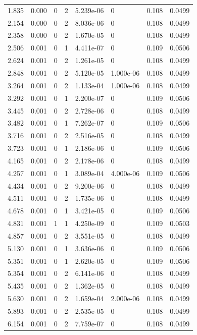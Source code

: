 \documentclass[preview]{standalone}
\begin{document}
{{\begin{tabular}{L{1.2cm}C{1.2cm} C{0.3cm}C{0.5cm} C{1.4cm}C{1.4cm} C{1.4cm}C{1.4cm}}
  1.835  &  0.000  & 0     &  2 &  5.239e-06  & 0  & 0.108 &  0.0499   \\ 
  2.154  &  0.000  & 0     &  2 &  8.036e-06  & 0  & 0.108 &  0.0499   \\ 
  2.358  &  0.000  & 0     &  2 &  1.670e-05  & 0  & 0.108 &  0.0499   \\ 
  2.506  &  0.001  & 0     &  1 &  4.411e-07  & 0  & 0.109 &  0.0506   \\ 
  2.624  &  0.001  & 0     &  2 &  1.261e-05  & 0  & 0.108 &  0.0499   \\ 
  2.848  &  0.001  & 0     &  2 &  5.120e-05  & 1.000e-06  & 0.108 &  0.0499   \\ 
  3.264  &  0.001  & 0     &  2 &  1.133e-04  & 1.000e-06  & 0.108 &  0.0499   \\ 
  3.292  &  0.001  & 0     &  1 &  2.200e-07  & 0  & 0.109 &  0.0506   \\ 
  3.445  &  0.001  & 0     &  2 &  2.728e-06  & 0  & 0.108 &  0.0499   \\ 
  3.482  &  0.001  & 0     &  1 &  7.262e-07  & 0  & 0.109 &  0.0506   \\ 
  3.716  &  0.001  & 0     &  2 &  2.516e-05  & 0  & 0.108 &  0.0499   \\ 
  3.723  &  0.001  & 0     &  1 &  2.186e-06  & 0  & 0.109 &  0.0506   \\ 
  4.165  &  0.001  & 0     &  2 &  2.178e-06  & 0  & 0.108 &  0.0499   \\ 
  4.257  &  0.001  & 0     &  1 &  3.089e-04  & 4.000e-06  & 0.109 &  0.0506   \\ 
  4.434  &  0.001  & 0     &  2 &  9.200e-06  & 0  & 0.108 &  0.0499   \\ 
  4.511  &  0.001  & 0     &  2 &  1.735e-06  & 0  & 0.108 &  0.0499   \\ 
  4.678  &  0.001  & 0     &  1 &  3.421e-05  & 0  & 0.109 &  0.0506   \\ 
  4.831  &  0.001  & 1     &  1 &  4.250e-09  & 0  & 0.109 &  0.0503   \\ 
  4.857  &  0.001  & 0     &  2 &  3.551e-05  & 0  & 0.108 &  0.0499   \\ 
  5.130  &  0.001  & 0     &  1 &  3.636e-06  & 0  & 0.109 &  0.0506   \\ 
  5.351  &  0.001  & 0     &  1 &  2.620e-05  & 0  & 0.109 &  0.0506   \\ 
  5.354  &  0.001  & 0     &  2 &  6.141e-06  & 0  & 0.108 &  0.0499   \\ 
  5.435  &  0.001  & 0     &  2 &  1.362e-05  & 0  & 0.108 &  0.0499   \\ 
  5.630  &  0.001  & 0     &  2 &  1.659e-04  & 2.000e-06  & 0.108 &  0.0499   \\ 
  5.893  &  0.001  & 0     &  2 &  2.535e-05  & 0  & 0.108 &  0.0499   \\ 
  6.154  &  0.001  & 0     &  2 &  7.759e-07  & 0  & 0.108 &  0.0499   \\ 
\hline 
\end{tabular} 

}}
\end{document}
